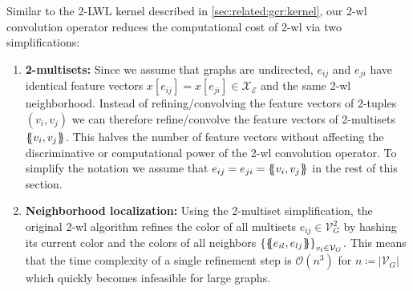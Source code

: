 Similar to the 2-LWL kernel described in \cref{sec:related:gcr:kernel}, our 2-\acs{wl} convolution operator reduces the computational cost of 2-\acs{wl} via two simplifications:
\begin{enumerate}[label=\textbf{\arabic*.}]
	\item \textbf{2-multisets:}
		Since we assume that graphs are undirected, $e_{ij}$ and $e_{ji}$ have identical feature vectors $x[e_{ij}] = x[e_{ji}] \in \mathcal{X}_{\mathcal{E}}$ and the same 2-\acs{wl} neighborhood.
		Instead of refining/convolving the feature vectors of 2-tuples $(v_i, v_j)$ we can therefore refine/convolve the feature vectors of 2-multisets $\ldblbrace v_i, v_j \rdblbrace$.
		This halves the number of feature vectors without affecting the discriminative or computational power of the 2-\acs{wl} convolution operator.
		To simplify the notation we assume that $e_{ij} = e_{ji} = \ldblbrace v_i, v_j \rdblbrace$ in the rest of this section.
	\item \textbf{Neighborhood localization:}
		Using the 2-multiset simplification, the original 2-\acs{wl} algorithm refines the color of all multisets $e_{ij} \in \mathcal{V}_G^2$ by hashing its current color and the colors of all neighbors ${\{ \ldblbrace e_{il}, e_{lj} \rdblbrace \}}_{v_l \in \mathcal{V}_G}$.
		This means that the time complexity of a single refinement step is $\mathcal{O}(n^3)$ for $n \coloneqq \left| \mathcal{V}_G \right|$ which quickly becomes infeasible for large graphs.


\end{enumerate}
